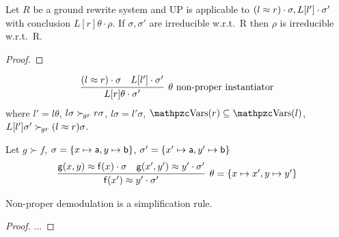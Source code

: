 \begin{lemma}
    Let $R$ be a ground rewrite system and UP is applicable to
    \( (l\approx r)\cdot\sigma, L[l']\cdot\sigma' \)
    with conclusion
    \( L[r]\theta\cdot\rho \).
    If $\sigma,\sigma'$ are irreducible w.r.t.~R then $\rho$ is irreducible w.r.t.~R.
\end{lemma}

\begin{proof}
\end{proof}

\begin{definition}
    \begin{gather*}
            \infer[\theta\text{ non-proper instantiator}]
            {L[r]\theta\cdot\sigma'}
            {(l\mEQ r)\cdot\sigma & L[l']\cdot\sigma'}
    \end{gather*}
    where
        $l'=l\theta$,
        $l\sigma\mathrel\succ_{\!gr} r\sigma$,
        $l\sigma = l'\sigma$,
        $\var(r)\subseteq\var(l)$,
        $L[l']\sigma'\mathrel\succ_{\!gr}(l\approx r)\sigma$.
    \end{definition}

\begin{example}
    Let $g\succ f$,
    $\sigma = \{ x\mapsto \mathsf{a}, y\mapsto \mathsf{b} \}$,
    $\sigma' = \{ x'\mapsto \mathsf{a}, y'\mapsto \mathsf{b} \}$
    \begin{align*}
    \infer[
        \theta = \{ x\mapsto x', y\mapsto y'\}
    ]{
        \mf(x') \mEQ y'\cdot\sigma'
    }{
        \mg(x,y)\mEQ \mf(x)\cdot\sigma & \mg(x',y')\mEQ y'\cdot\sigma'
    }
    \end{align*}
\end{example}

\begin{lemma}Non-proper demodulation is a simplification rule.\end{lemma}
    \begin{proof}
        ...
    \end{proof}

